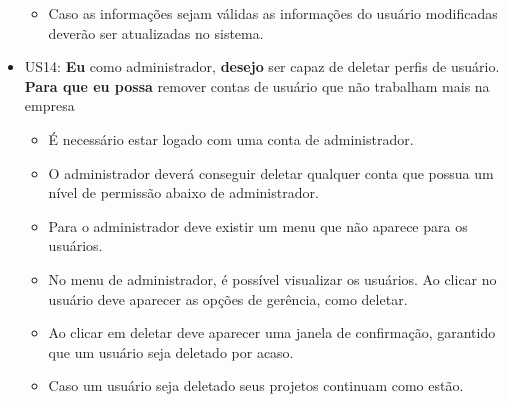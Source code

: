 \begin{itemize}
\begin{itemize}
    	\item Caso as informações sejam válidas as informações do usuário modificadas deverão ser atualizadas no sistema.
    \end{itemize}
        \item US14: \textbf{Eu} como administrador, \textbf{desejo} ser capaz de deletar perfis de usuário. \textbf{Para que eu possa} remover contas de usuário que não trabalham mais na empresa
    \begin{itemize}
    	\item É necessário estar logado com uma conta de administrador. 
    	\item O administrador deverá conseguir deletar qualquer conta que possua um nível de permissão abaixo de administrador.
    	\item Para o administrador deve existir um menu que não aparece para os usuários.
    	\item No menu de administrador, é possível visualizar os usuários. Ao clicar no usuário deve aparecer as opções de gerência, como deletar.
    	\item Ao clicar em deletar deve aparecer uma janela de confirmação, garantido que um usuário seja deletado por acaso.
    	\item Caso um usuário seja deletado seus projetos continuam como estão.
    \end{itemize}
  \end{itemize}

